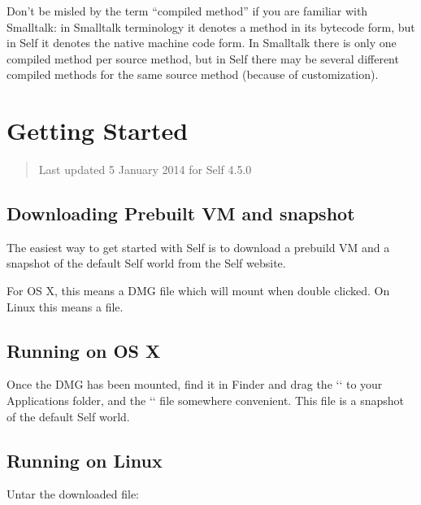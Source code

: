 \documentclass[letterpaper,10pt,english]{sphinxmanual}
\begin{document}
Don’t be misled by the term “compiled method” if you are familiar with Smalltalk: in Smalltalk terminology it denotes a method in its bytecode form, but in Self it denotes the native machine code form. In Smalltalk there is only one compiled method per source method, but in Self there may be several different compiled methods for the same source method (because of customization).


\chapter{Getting Started}
\label{\detokenize{gettingstarted:getting-started}}\label{\detokenize{gettingstarted::doc}}\begin{quote}

Last updated 5 January 2014 for Self 4.5.0
\end{quote}


\section{Downloading Prebuilt VM and snapshot}
\label{\detokenize{gettingstarted:downloading-prebuilt-vm-and-snapshot}}
The easiest way to get started with Self is to download a prebuild VM and a snapshot of the default Self world from the \label{\detokenize{gettingstarted:self-website}}Self website.

For OS X, this means a DMG file which will mount when double clicked. On Linux this means a  file.


\section{Running on OS X}
\label{\detokenize{gettingstarted:running-on-os-x}}
Once the DMG has been mounted, find it in Finder and drag the `` to your Applications folder, and the `` file somewhere convenient. This file is a snapshot of the default Self world.


\section{Running on Linux}
\label{\detokenize{gettingstarted:running-on-linux}}
Untar the downloaded  file:

\begin{sphinxVerbatim}[commandchars=\\\{\}]
  
\end{sphinxVerbatim}
\end{document}
